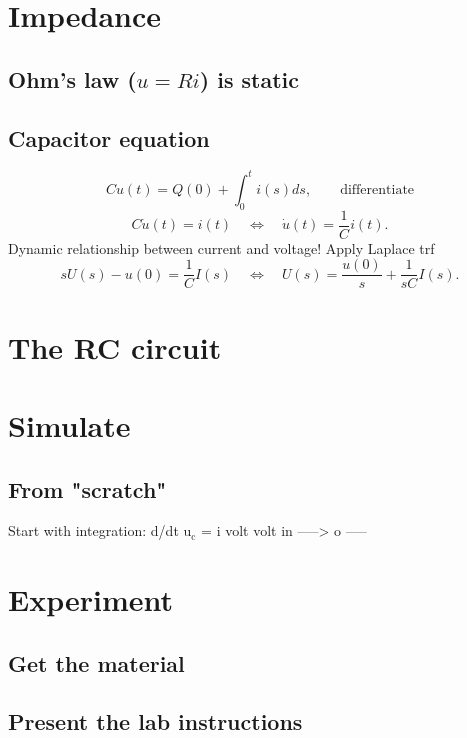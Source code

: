 \documentclass[a4paper]{scrartcl}
\begin{document}
\section{Impedance}
\label{sec-3}

\subsection{Ohm's law (\(u=Ri\)) is static}
\label{sec-3-1}

\subsection{Capacitor equation}
\label{sec-3-2}
\[ Cu(t) = Q(0) + \int_0^t i(s) ds, \qquad \text{differentiate}\]
\[ C \dot{u}(t) = i(t) \quad \Leftrightarrow \quad \dot{u}(t) = \frac{1}{C} i(t). \]
Dynamic relationship between current and voltage! Apply Laplace trf
\[ sU(s) - u(0) = \frac{1}{C} I(s) \quad \Leftrightarrow \quad U(s) = \frac{u(0)}{s} + \frac{1}{sC} I(s). \]




\section{The RC circuit}
\label{sec-4}

\section{Simulate}
\label{sec-5}

\subsection{From "scratch"}
\label{sec-5-1}
   Start with integration:  d/dt u$_{\text{c}}$ =  i
                  volt
volt in -----> o -----
\section{Experiment}
\label{sec-6}
\subsection{Get the material}
\label{sec-6-1}

\subsection{Present the lab instructions}
\label{sec-6-2}
\end{document}
